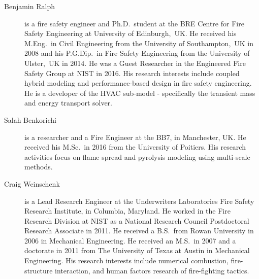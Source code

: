 \begin{description}
\item[Benjamin Ralph] is a fire safety engineer and Ph.D.~student at the BRE Centre for Fire Safety Engineering at University of Edinburgh,~UK. He received his M.Eng.~in Civil Engineering from the University of Southampton,~UK in 2008 and his P.G.Dip.~in Fire Safety Engineering from the University of Ulster,~UK in 2014. He was a Guest Researcher in the Engineered Fire Safety Group at NIST in 2016. His research interests include coupled hybrid modeling and performance-based design in fire safety engineering. He is a developer of the HVAC sub-model - specifically the transient mass and energy transport solver.

\item[Salah Benkorichi] is a researcher and a Fire Engineer at the BB7, in Manchester, UK. He received his M.Sc.~in 2016 from the University of Poitiers. His research activities focus on flame spread and pyrolysis modeling using multi-scale methods.

\item[Craig Weinschenk] is a Lead Research Engineer at the Underwriters Laboratories Fire Safety Research Institute, in Columbia, Maryland. He worked in the Fire Research Division at NIST as a National Research Council Postdoctoral Research Associate in 2011. He received a B.S.~from Rowan University in 2006 in Mechanical Engineering. He received an M.S.~in 2007 and a doctorate in 2011 from The University of Texas at Austin in Mechanical Engineering. His research interests include numerical combustion, fire-structure interaction, and human factors research of fire-fighting tactics.

\end{description}


